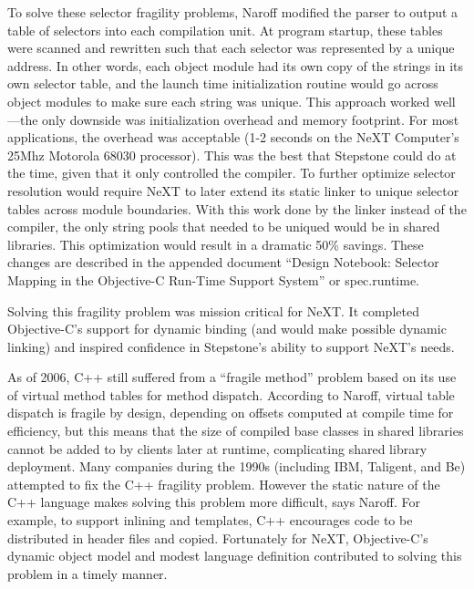 \documentclass[acmsmall]{acmart}\settopmatter{}
\begin{document}
To solve these selector fragility problems, Naroff modified the parser to output a table of selectors into each compilation unit. At program startup, these tables were scanned and rewritten such that each selector was represented by a unique address. In other words, each object module had its own copy of the strings in its own selector table, and the launch time initialization routine would go across object modules to make sure each string was unique. This approach worked well---the only downside was initialization overhead and memory footprint. For most applications, the overhead was acceptable (1-2 seconds on the NeXT Computer's 25Mhz Motorola 68030 processor). This was the best that Stepstone could do at the time, given that it only controlled the compiler. To further optimize selector resolution would require NeXT to later extend its static linker to unique selector tables across module boundaries. With this work done by the linker instead of the compiler, the only string pools that needed to be uniqued would be in shared libraries. This optimization would result in a dramatic 50\% savings. These changes are described in the appended document ``Design Notebook: Selector Mapping in the Objective-C Run-Time Support System'' or spec.runtime. 

Solving this fragility problem was mission critical for NeXT. It completed Objective-C's support for dynamic binding (and would make possible dynamic linking) and inspired confidence in Stepstone's ability to support NeXT's needs.

As of 2006, C++ still suffered from a ``fragile method'' problem based on its use of virtual method tables for method dispatch. According to Naroff, virtual table dispatch is fragile by design, depending on offsets computed at compile time for efficiency, but this means that the size of compiled base classes in shared libraries cannot be added to by clients later at runtime, complicating shared library deployment. Many companies during the 1990s (including IBM, Taligent, and Be) attempted to fix the C++ fragility problem. However the static nature of the C++ language makes solving this problem more difficult, says Naroff. For example, to support inlining and templates, C++ encourages code to be distributed in header files and copied. Fortunately for NeXT, Objective-C's dynamic object model and modest language definition contributed to solving this problem in a timely manner. 
\end{document}
